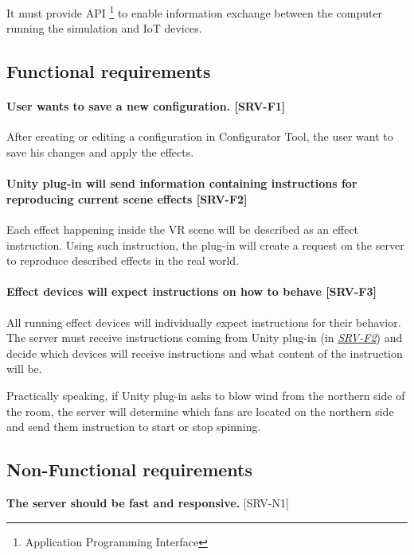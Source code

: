 It must provide API \footnote{Application Programming Interface} to enable
information exchange between the computer running the simulation and IoT devices.


\subsection*{Functional requirements}
\hypertarget{x-\textbf{user-wants-to-save-a-new-configuration.}-[srv-f1]}{\paragraph*{\textbf{User wants to save a new configuration.} [SRV-F1]}}
After creating or editing a configuration in Configurator Tool, the user
want to save his changes and apply the effects.


\hypertarget{x-\textbf{unity-plug-in-will-send-information-containing-instructions-for-reproducing-current-scene-effects}-[srv-f2]}{\paragraph*{\textbf{Unity plug-in will send information containing instructions for reproducing current scene effects} [SRV-F2]}}
Each effect happening inside the VR scene will be described as an effect
instruction. Using such instruction, the plug-in will create a request on the server to
reproduce described effects in the real world.


\hypertarget{x-\textbf{effect-devices-will-expect-instructions-on-how-to-behave}-[srv-f3]}{\paragraph*{\textbf{Effect devices will expect instructions on how to behave} [SRV-F3]}}
All running effect devices will individually expect instructions for their
behavior. The server must receive instructions coming from Unity plug-in (in \hyperlink{srv-f2}{\textit{SRV-F2}})
and decide which devices will receive instructions and what content of the
instruction will be.


Practically speaking, if Unity plug-in asks to blow wind from the northern side of
the room, the server will determine which fans are located on the northern side
and send them instruction to start or stop spinning.


\subsection*{Non-Functional requirements}
\textbf{The server should be fast and responsive.} [SRV-N1]

